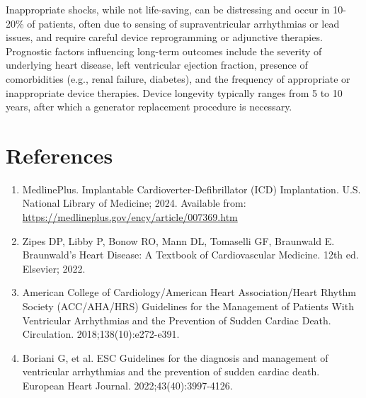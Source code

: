 Inappropriate shocks, while not life-saving, can be distressing and occur in 10-20\% of patients, often due to sensing of supraventricular arrhythmias or lead issues, and require careful device reprogramming or adjunctive therapies. Prognostic factors influencing long-term outcomes include the severity of underlying heart disease, left ventricular ejection fraction, presence of comorbidities (e.g., renal failure, diabetes), and the frequency of appropriate or inappropriate device therapies. Device longevity typically ranges from 5 to 10 years, after which a generator replacement procedure is necessary.

\section*{References}
\begin{enumerate}
  \item MedlinePlus. Implantable Cardioverter-Defibrillator (ICD) Implantation. U.S. National Library of Medicine; 2024. Available from: \url{https://medlineplus.gov/ency/article/007369.htm}
  
  \item Zipes DP, Libby P, Bonow RO, Mann DL, Tomaselli GF, Braunwald E. Braunwald's Heart Disease: A Textbook of Cardiovascular Medicine. 12th ed. Elsevier; 2022.
  
  \item American College of Cardiology/American Heart Association/Heart Rhythm Society (ACC/AHA/HRS) Guidelines for the Management of Patients With Ventricular Arrhythmias and the Prevention of Sudden Cardiac Death. Circulation. 2018;138(10):e272-e391.
  
  \item Boriani G, et al. ESC Guidelines for the diagnosis and management of ventricular arrhythmias and the prevention of sudden cardiac death. European Heart Journal. 2022;43(40):3997-4126.
\end{enumerate}

\clearpage

